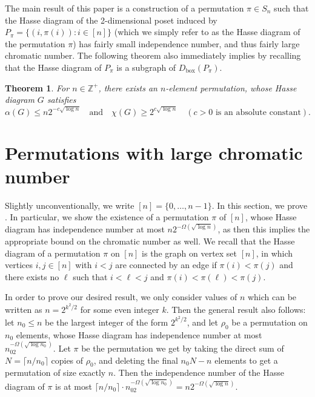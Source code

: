 \documentclass[11pt]{article}
\newtheorem{theorem}{Theorem}
\theoremstyle{definition}
\DeclareMathOperator{\bx}{box}
\begin{document}
The main result of this paper is a construction of a permutation $\pi\in S_n$ such that the Hasse diagram of the  2-dimensional poset induced by $P_{\pi}=\{(i,\pi(i)):i\in [n]\}$ (which we simply refer to as the Hasse diagram of the permutation $\pi$)  has fairly small independence number, and thus fairly large chromatic number. The following theorem also immediately implies  by recalling that the Hasse diagram of $P_{\pi}$ is a subgraph of $D_{\bx}(P_{\pi})$.

\begin{theorem}\label{thm:main}
    For $n\in \mathbb{Z}^+$, there exists an $n$-element permutation, whose Hasse diagram $G$ satisfies $$\alpha(G)\leq n2^{-c\sqrt{\log n}}\quad\text{and}\quad\chi(G)\geq 2^{c\sqrt{\log n}}\quad (c>0\text{ is an absolute constant}).$$
\end{theorem}



\section{Permutations with large chromatic number}

 Slightly unconventionally, we write $[n]=\{0,\dots,n-1\}$. In this section, we prove . In particular, we show the existence of a permutation $\pi$ of $[n]$, whose Hasse diagram has independence number at most $n2^{-\Omega(\sqrt{\log n})}$, as then this implies the appropriate bound on the chromatic number as well. We recall that the Hasse diagram of a permutation $\pi$ on $[n]$ is the graph on vertex set $[n]$, in which vertices $i,j\in [n]$ with $i<j$ are connected by an edge if $\pi(i)<\pi(j)$ and there exists no $\ell$ such that $i<\ell<j$ and $\pi(i)<\pi(\ell)<\pi(j).$
 
 In order to prove our desired result, we only consider values of $n$ which can be written as $n=2^{k^2/2}$ for some even integer $k$. Then the general result also follows: let $n_0\leq n$ be the largest integer of the form $2^{k^2/2}$, and let $\rho_0$ be a permutation on $n_0$ elements, whose Hasse diagram has independence number at most $n_02^{-\Omega(\sqrt{\log n_0})}$. Let $\pi$ be the permutation we get by taking the direct sum of $N=\lceil n/n_0\rceil$ copies of $\rho_0$, and deleting the final $n_0N-n$  elements to get a permutation of size exactly $n$. Then the independence number of the Hasse diagram of $\pi$ is at most $\lceil n/n_0\rceil\cdot n_02^{-\Omega(\sqrt{\log n_0})}=n2^{-\Omega(\sqrt{\log n})}$.
\end{document}
